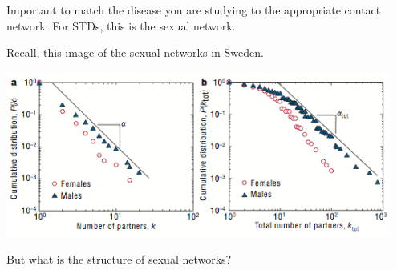 \documentclass[aspectratio=169]{beamer}
\begin{document}
\begin{frame}

Important to match the disease you are studying to the appropriate contact network.  For STDs, this is the sexual network.

Recall, this image of the sexual networks in Sweden.
\begin{center}
\includegraphics[width = 0.95\textwidth]{figures/liljeros_web_2001_fig2}
\end{center}

But what is the structure of sexual networks?


\end{frame}
\end{document}
